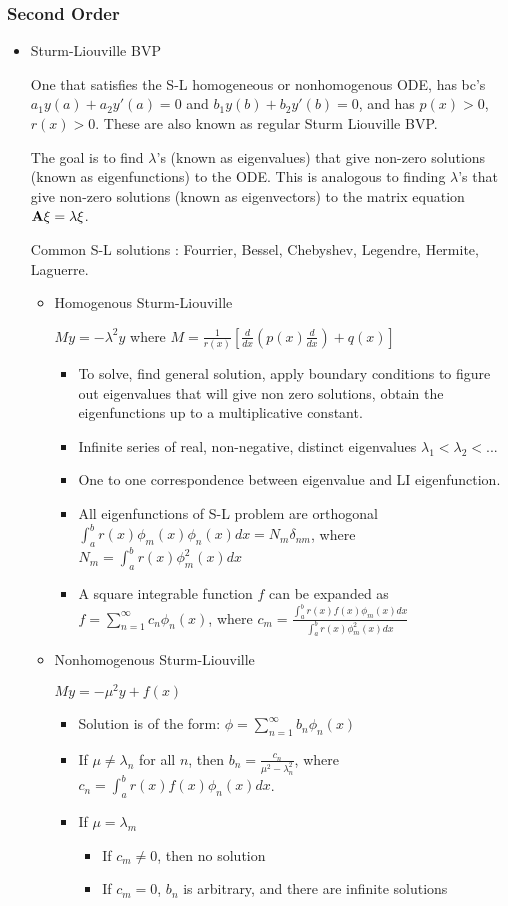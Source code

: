 \documentclass[11pt]{article}
\begin{document}
\subsubsection{Second Order}
	\begin{itemize}
	\item Sturm-Liouville BVP
	
	One that satisfies the S-L homogeneous or nonhomogenous ODE, has bc's $a_1y(a)+a_2y'(a)=0$ and $b_1y(b)+b_2y'(b)=0$, and has $p(x)>0$, $r(x)>0$. These are also known as regular Sturm Liouville BVP. 
		
	The goal is to find $\lambda$'s (known as eigenvalues) that give non-zero solutions (known as eigenfunctions) to the ODE. This is analogous to finding $\lambda$'s that give non-zero solutions (known as eigenvectors) to the matrix equation $\bold{A}\xi=\lambda \xi$.
	
	Common S-L solutions : Fourrier, Bessel, Chebyshev, Legendre, Hermite, Laguerre. 
		\begin{itemize}
		\item Homogenous Sturm-Liouville 
		
		$My=-\lambda^2y$ where $M=\frac{1}{r(x)}\left[\frac{d}{dx}\left(p(x)\frac{d}{dx}\right)+q(x)\right]$
			\begin{itemize}
			\item To solve, find general solution, apply boundary conditions to figure out eigenvalues that will give non zero solutions, obtain the eigenfunctions up to a multiplicative constant.
			\item Infinite series of real, non-negative, distinct eigenvalues $\lambda_1<\lambda_2<...$
			\item One to one correspondence between eigenvalue and LI eigenfunction.
			\item All eigenfunctions of S-L problem are orthogonal $\int_a^b r(x)\phi_m(x)\phi_n(x)dx=N_m\delta_{nm}$, where $N_m=\int_a^br(x)\phi_m^2(x)dx$
			\item A square integrable function $f$ can be expanded as $f=\displaystyle\sum_{n=1}^{\infty}c_n \phi_n(x)$, where $c_m=\frac{\int_a^br(x)f(x)\phi_m(x)dx}{\int_a^br(x)\phi_m^2(x)dx}$
			\end{itemize}
		\item Nonhomogenous Sturm-Liouville
		
		$My=-\mu^2y+f(x)$
			\begin{itemize}
			\item Solution is of the form: $\phi=\displaystyle\sum_{n=1}^{\infty}b_n \phi_n(x)$
			\item If $\mu \neq \lambda_n$ for all $n$, then $b_n=\frac{c_n}{\mu^2-\lambda_n^2}$, where $c_n=\int_a^br(x)f(x)\phi_n(x)dx$.
			\item If $\mu=\lambda_m$
				\begin{itemize}
				\item If $c_m\neq0$, then no solution
				\item If $c_m=0$, $b_n$ is arbitrary, and there are infinite solutions
				\end{itemize}
			\end{itemize}
			

\end{itemize}
\end{itemize}
\end{document}
